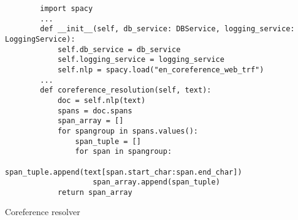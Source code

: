 \begin{listing}
    \begin{verbatim}
        import spacy
        ...
        def __init__(self, db_service: DBService, logging_service: LoggingService):
            self.db_service = db_service
            self.logging_service = logging_service
            self.nlp = spacy.load("en_coreference_web_trf")
        ...
        def coreference_resolution(self, text):
            doc = self.nlp(text)
            spans = doc.spans
            span_array = []
            for spangroup in spans.values():
                span_tuple = []
                for span in spangroup:
                    span_tuple.append(text[span.start_char:span.end_char])
                    span_array.append(span_tuple)
            return span_array
    \end{verbatim}
    \caption[Coreference resolver]{Coreference resolver}
    \label{code:coreference}
\end{listing}
